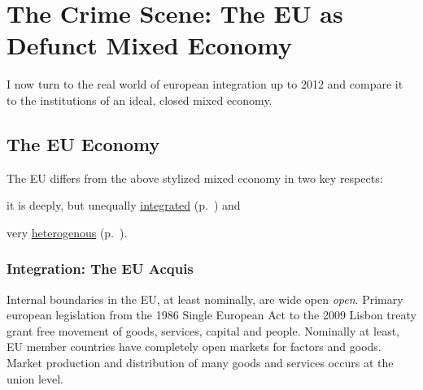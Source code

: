 

\section{The Crime Scene: The EU as Defunct Mixed Economy} \label{sec:EU-reality}
I now turn to the real world of european integration up to 2012 and compare it to the institutions of an ideal, closed mixed economy.
	
	\subsection{The EU Economy}
The \gls{EU} differs from the above stylized mixed economy in two key respects:
\begin{inparaenum}[1)] 
	\item it is deeply, but unequally \hyperref[sec:EU-Acquis]{integrated} (p.~\pageref{sec:EU-Acquis}) and 
	\item very \hyperref[sec:sources-of-wealth]{heterogenous} (p.~\pageref{sec:sources-of-wealth}).
\end{inparaenum}

\subsubsection[Integration]{Integration: The EU Acquis} \label{sec:EU-Acquis}
Internal boundaries in the \gls{EU}, at least nominally, are wide open \emph{open}. %
Primary european legislation from the 1986 Single European Act to the 2009 Lisbon treaty grant free movement of goods, services, capital and people. Nominally at least, \gls{EU} member countries have completely open markets for factors and goods. Market production and distribution of many goods and services occurs at the union level.

